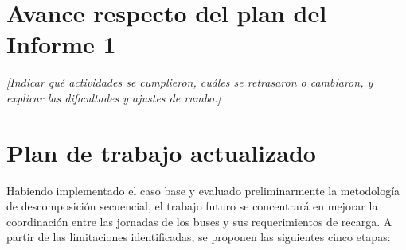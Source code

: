 \section{Avance respecto del plan del Informe 1}
\textit{[Indicar qué actividades se cumplieron, cuáles se retrasaron o cambiaron,
y explicar las dificultades y ajustes de rumbo.]}

\section{Plan de trabajo actualizado}

Habiendo implementado el caso base y evaluado preliminarmente la metodología
de descomposición secuencial, el trabajo futuro se concentrará en mejorar la
coordinación entre las jornadas de los buses y sus requerimientos de recarga.
A partir de las limitaciones identificadas, se proponen las siguientes
cinco etapas:

